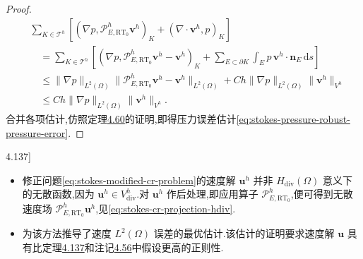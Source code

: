 \begin{proof}
\begin{align*}
  &\sum_{K\in\mathcal{T}^h}
       \left[(\nabla p,\mathcal{P}_{E,\mathrm{RT}_0}^h\bm{v}^h)_K
             +(\nabla\cdot\bm{v}^h,p)_K\right]\\
  &\quad=
     \sum_{K\in\mathcal{T}^h}\left[
       (\nabla p,\mathcal{P}_{E,\mathrm{RT}_0}^h\bm{v}^h-\bm{v}^h)_K
       +\sum_{E\subset\partial K}\int_E
          p\,\bm{v}^h\cdot\bm{n}_E\,\mathrm{d}s\right]\\
  &\quad\leq
       \|\nabla p\|_{L^2(\Omega)}
       \|\mathcal{P}_{E,\mathrm{RT}_0}^h\bm{v}^h-\bm{v}^h\|_{L^2(\Omega)}
       +Ch\|\nabla p\|_{L^2(\Omega)}\|\bm{v}^h\|_{V^h}\\
  &\quad\leq Ch\|\nabla p\|_{L^2(\Omega)}
       \|\bm{v}^h\|_{V^h}.
\end{align*}
合并各项估计,仿照定理\hyperref[thm:stokes-nonconforming-pressure-error]{4.60}的证明,即得压力误差估计\cref{eq:stokes-pressure-robust-pressure-error}.
\end{proof}

\begin{note}[关于定理\hyperref[thm:stokes-pressure-robust-error]{4.137}]\label{note:stokes-pressure-robust-theorem-comments}
\begin{itemize}
  \item 修正问题\cref{eq:stokes-modified-cr-problem}的速度解 $\bm{u}^h$ 并非 $H_{\mathrm{div}}(\Omega)$ 意义下的无散函数,因为 $\bm{u}^h\in V_{\mathrm{div}}^h$.对 $\bm{u}^h$ 作后处理,即应用算子 $\mathcal{P}_{E,\mathrm{RT}_0}^h$,便可得到无散速度场 $\mathcal{P}_{E,\mathrm{RT}_0}^h\bm{u}^h$,见\cref{eq:stokes-cr-projection-hdiv}.
  \item \textcite{LinkeMerdonWollner2016a}为该方法推导了速度 $L^2(\Omega)$ 误差的最优估计.该估计的证明要求速度解 $\bm{u}$ 具有比定理\hyperref[thm:stokes-pressure-robust-error]{4.137}和注记\hyperref[note:stokes-nonconforming-consistency-smoothness]{4.56}中假设更高的正则性.
\end{itemize}
\end{note}

